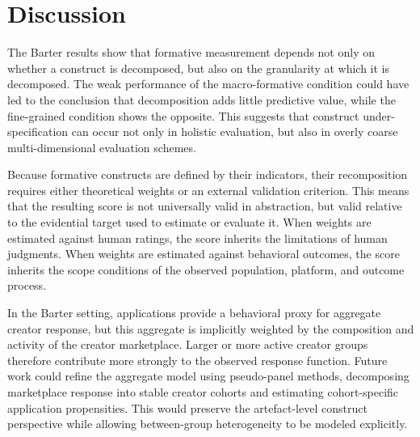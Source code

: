 

\section{Discussion}



The Barter results show that formative measurement depends not only on whether a construct is decomposed, but also on the granularity at which it is decomposed. The weak performance of the macro-formative condition could have led to the conclusion that decomposition adds little predictive value, while the fine-grained condition shows the opposite. This suggests that construct under-specification can occur not only in holistic evaluation, but also in overly coarse multi-dimensional evaluation schemes.

Because formative constructs are defined by their indicators, their recomposition requires either theoretical weights or an external validation criterion. This means that the resulting score is not universally valid in abstraction, but valid relative to the evidential target used to estimate or evaluate it. When weights are estimated against human ratings, the score inherits the limitations of human judgments. When weights are estimated against behavioral outcomes, the score inherits the scope conditions of the observed population, platform, and outcome process.

In the Barter setting, applications provide a behavioral proxy for aggregate creator response, but this aggregate is implicitly weighted by the composition and activity of the creator marketplace. Larger or more active creator groups therefore contribute more strongly to the observed response function. Future work could refine the aggregate model using pseudo-panel methods, decomposing marketplace response into stable creator cohorts and estimating cohort-specific application propensities. This would preserve the artefact-level construct perspective while allowing between-group heterogeneity to be modeled explicitly.





